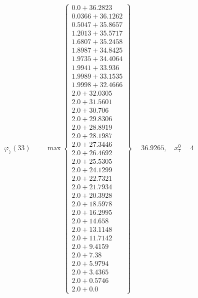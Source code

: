 \documentclass{article}
\begin{document}
\begin{align*}
  
\varphi_{7}(33) &= \max \left\{ \begin{array}{c}
0.0 + 36.2823 \\
 0.0366 + 36.1262 \\
 0.5047 + 35.8657 \\
 1.2013 + 35.5717 \\
 1.6807 + 35.2458 \\
 1.8987 + 34.8425 \\
 1.9735 + 34.4064 \\
 1.9941 + 33.936 \\
 1.9989 + 33.1535 \\
 1.9998 + 32.4666 \\
 2.0 + 32.0305 \\
 2.0 + 31.5601 \\
 2.0 + 30.706 \\
 2.0 + 29.8306 \\
 2.0 + 28.8919 \\
 2.0 + 28.1987 \\
 2.0 + 27.3446 \\
 2.0 + 26.4692 \\
 2.0 + 25.5305 \\
 2.0 + 24.1299 \\
 2.0 + 22.7321 \\
 2.0 + 21.7934 \\
 2.0 + 20.3928 \\
 2.0 + 18.5978 \\
 2.0 + 16.2995 \\
 2.0 + 14.658 \\
 2.0 + 13.1148 \\
 2.0 + 11.7142 \\
 2.0 + 9.4159 \\
 2.0 + 7.38 \\
 2.0 + 5.9794 \\
 2.0 + 3.4365 \\
 2.0 + 0.5746 \\
 2.0 + 0.0
\end{array} \right\}=36.9265,\quad x_{7}^0=4\\
  
  
  

\end{align*}
\end{document}
